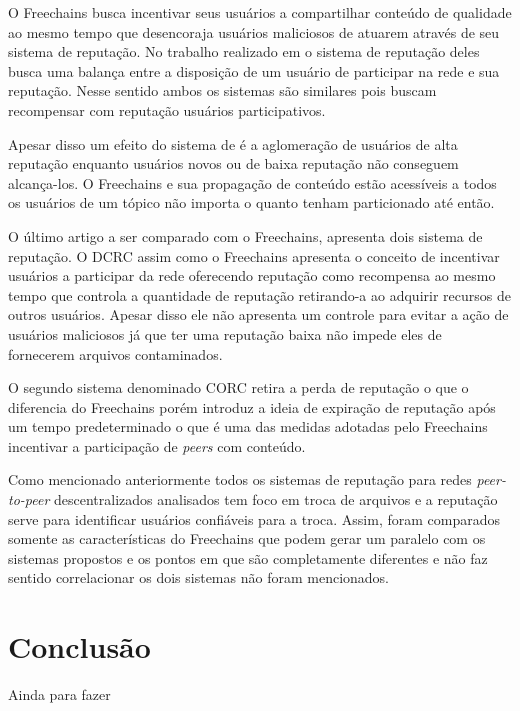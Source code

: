\documentclass[12pt]{article}
\newcommand{\FC} {Freechains\xspace}
\newcommand{\PtoP} {\emph{peer-to-peer}\xspace}
\begin{document}
O \FC busca incentivar seus usuários a compartilhar conteúdo de qualidade ao mesmo tempo que desencoraja usuários maliciosos de atuarem através de seu sistema de reputação. No trabalho realizado em \cite{mortazavi2006cumulative} o sistema de reputação deles busca uma balança entre a disposição de um usuário de participar na rede e sua reputação. Nesse sentido ambos os sistemas são similares pois buscam recompensar com reputação usuários participativos.

Apesar disso um efeito do sistema de \cite{mortazavi2006cumulative} é a aglomeração de usuários de alta reputação enquanto usuários novos ou de baixa reputação não conseguem alcança-los. O \FC e sua propagação de conteúdo estão acessíveis a todos os usuários de um tópico não importa o quanto tenham particionado até então.

O último artigo a ser comparado com o \FC, \cite{gupta2003reputation} apresenta dois sistema de reputação. O DCRC assim como o \FC apresenta o conceito de incentivar usuários a participar da rede oferecendo reputação como recompensa ao mesmo tempo que controla a quantidade de reputação retirando-a ao adquirir recursos de outros usuários. Apesar disso ele não apresenta um controle para evitar a ação de usuários maliciosos já que ter uma reputação baixa não impede eles de fornecerem arquivos contaminados.

O segundo sistema denominado CORC retira a perda de reputação o que o diferencia do \FC porém introduz a ideia de expiração de reputação após um tempo predeterminado o que é uma das medidas adotadas pelo \FC incentivar a participação de \emph{peers} com conteúdo.

Como mencionado anteriormente todos os sistemas de reputação para redes \PtoP descentralizados analisados tem foco em troca de arquivos e a reputação serve para identificar usuários confiáveis para a troca. Assim, foram comparados somente as características do \FC que podem gerar um paralelo com os sistemas propostos e os pontos em que são completamente diferentes e não faz sentido correlacionar os dois sistemas não foram mencionados.  

\section{Conclusão}\label{sec:conclusao}

Ainda para fazer



\end{document}

